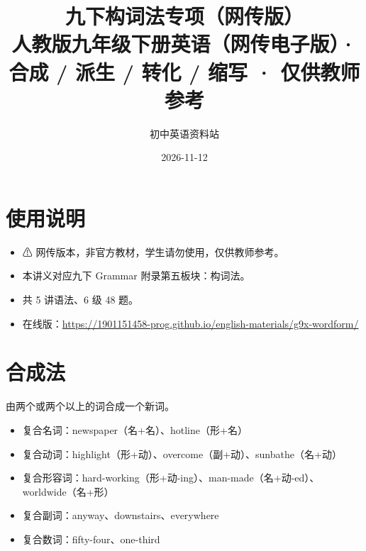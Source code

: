 \documentclass[11pt,a4paper]{ctexart}
\title{\textbf{九下构词法专项（网传版）}\\[4pt]
\large 人教版九年级下册英语（网传电子版）· 合成 / 派生 / 转化 / 缩写 · 仅供教师参考}
\author{初中英语资料站}
\date{2026-11-12}
\begin{document}
\maketitle

\section*{使用说明}
\begin{itemize}[leftmargin=1.4em]
\item ⚠ 网传版本，非官方教材，学生请勿使用，仅供教师参考。
\item 本讲义对应九下 Grammar 附录第五板块：构词法。
\item 共 5 讲语法、6 级 48 题。
\item 在线版：\url{https://1901151458-prog.github.io/english-materials/g9x-wordform/}
\end{itemize}

\begin{center}
\end{center}
\bigskip
\section{合成法}
由两个或两个以上的词合成一个新词。
\begin{itemize}[leftmargin=1.4em]
\item 复合名词：newspaper（名+名）、hotline（形+名）
\item 复合动词：highlight（形+动）、overcome（副+动）、sunbathe（名+动）
\item 复合形容词：hard-working（形+动-ing）、man-made（名+动-ed）、worldwide（名+形）
\item 复合副词：anyway、downstairs、everywhere
\item 复合数词：fifty-four、one-third
\end{itemize}
\end{document}
